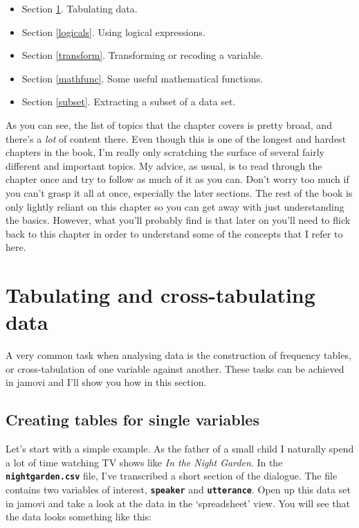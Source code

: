 \documentclass[
]{book}
\providecommand{\tightlist}{%
  \setlength{\itemsep}{0pt}\setlength{\parskip}{0pt}}
\begin{document}
\begin{itemize}
\tightlist
\item
  Section \ref{freqtables}. Tabulating data.
\item
  Section \ref{logicals}. Using logical expressions.
\item
  Section \ref{transform}. Transforming or recoding a variable.
\item
  Section \ref{mathfunc}. Some useful mathematical functions.
\item
  Section \ref{subset}. Extracting a subset of a data set.
\end{itemize}

As you can see, the list of topics that the chapter covers is pretty broad, and there's a \emph{lot} of content there. Even though this is one of the longest and hardest chapters in the book, I'm really only scratching the surface of several fairly different and important topics. My advice, as usual, is to read through the chapter once and try to follow as much of it as you can. Don't worry too much if you can't grasp it all at once, especially the later sections. The rest of the book is only lightly reliant on this chapter so you can get away with just understanding the basics. However, what you'll probably find is that later on you'll need to flick back to this chapter in order to understand some of the concepts that I refer to here.

\hypertarget{freqtables}{%
\section{Tabulating and cross-tabulating data}\label{freqtables}}

A very common task when analysing data is the construction of frequency tables, or cross-tabulation of one variable against another. These tasks can be achieved in jamovi and I'll show you how in this section.

\hypertarget{creating-tables-for-single-variables}{%
\subsection{Creating tables for single variables}\label{creating-tables-for-single-variables}}

Let's start with a simple example. As the father of a small child I naturally spend a lot of time watching TV shows like \emph{In the Night Garden}. In the \textbf{\texttt{nightgarden.csv}} file, I've transcribed a short section of the dialogue. The file contains two variables of interest, \textbf{\texttt{speaker}} and \textbf{\texttt{utterance}}. Open up this data set in jamovi and take a look at the data in the `spreadsheet' view. You will see that the data looks something like this:
\end{document}
